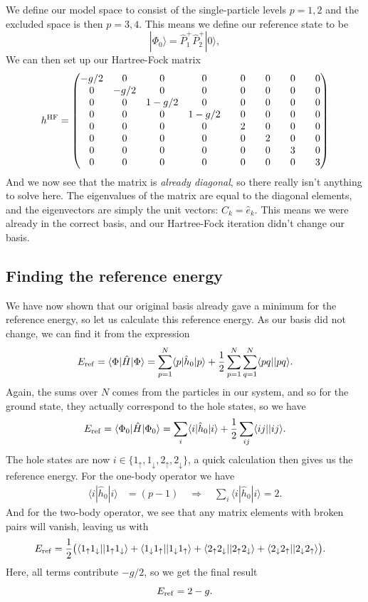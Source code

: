 \documentclass[a4paper, 11pt, notitlepage, english]{article}
\newcommand{\ket}[1]{|#1 \rangle}
\newcommand{\braket}[2]{\langle #1 | #2 \rangle}
\newcommand{\brakket}[2]{\langle #1 || #2 \rangle}
\newcommand{\op}[1]{\hat{#1}}
\newcommand{\braopket}[3]{\langle #1 | {#2} | #3 \rangle}
\renewcommand{\d}{{\rm d}}
\renewcommand{\u}{\uparrow}
\renewcommand{\d}{\downarrow}
\begin{document}
We define our model space to consist of the single-particle levels $p=1,2$ and the excluded space is then $p=3,4$. This means we define our reference state to be
$$\ket{\Phi_0} = \op{P}_1^+ \op{P}_2^+ \ket{0},$$
We can then set up our Hartree-Fock matrix
\begin{align*}
h^{\rm HF} = 
\begin{pmatrix}
-g/2 & 0 & 0 & 0 & \quad 0 & \quad 0 & \quad 0 & \quad 0 \\
0 & -g/2  & 0 & 0 & \quad 0 & \quad 0 & \quad 0 & \quad 0 \\
0 & 0 & 1-g/2 & 0 & \quad 0 & \quad 0 & \quad 0 & \quad 0 \\
0 & 0 & 0 & 1-g/2 & \quad 0 & \quad 0 & \quad 0 & \quad 0 \\
0 & 0 & 0 & 0 & \quad 2 & \quad 0 & \quad 0 & \quad 0 \\
0 & 0 & 0 & 0 & \quad 0 & \quad 2 & \quad 0 & \quad 0 \\
0 & 0 & 0 & 0 & \quad 0 & \quad 0 & \quad 3 & \quad 0 \\
0 & 0 & 0 & 0 & \quad 0 & \quad 0 & \quad 0 & \quad 3 \\
\end{pmatrix}
\end{align*}
And we now see that the matrix is \emph{already diagonal}, so there really isn't anything to solve here. The eigenvalues of the matrix are equal to the diagonal elements, and the eigenvectors are simply the unit vectors: $C_k = \hat{e}_k$. This means we were already in the correct basis, and our Hartree-Fock iteration didn't change our basis.

\subsection*{Finding the reference energy}
We have now shown that our original basis already gave a minimum for the reference energy, so let us calculate this reference energy. As our basis did not change, we can find it from the expression
$$E_{\rm ref} = \braopket{\Phi}{\op{H}}{\Phi} = \sum_{p=1}^N \braopket{p}{\op{h}_0}{p} + \frac{1}{2}\sum_{p=1}^N\sum_{q=1}^N\braket{pq|}{pq}.$$
Again, the sums over $N$ comes from the particles in our system, and so for the ground state, they actually correspond to the hole states, so we have
$$E_{\rm ref} = \braopket{\Phi_0}{\op{H}}{\Phi_0} = \sum_{i} \braopket{i}{\op{h}_0}{i} + \frac{1}{2}\sum_{ij} \brakket{ij}{ij}.$$
The hole states are now $i\in\{1_\u, 1_\d, 2_\u, 2_\d \}$, a quick calculation then gives us the reference energy. For the one-body operator we have
\begin{align*}
\braopket{i}{\op{h}_0}{i} &= (p-1) \quad \Rightarrow \quad \sum_{i} \braopket{i}{\op{h}_0}{i} = 2.
\end{align*}
And for the two-body operator, we see that any matrix elements with broken pairs will vanish, leaving us with
\begin{align*}
E_{\rm ref} &=   
\frac{1}{2}\big(
\brakket{1_\u1_\d}{1_\u1_\d} + \brakket{1_\d1_\u}{1_\d1_\u}
+ \brakket{2_\u2_\d}{2_\u2_\d} + \brakket{2_\d2_\u}{2_\d2_\u}
\big).
\end{align*}
Here, all terms contribute $-g/2$, so we get the final result
$$E_{\rm ref} = 2-g.$$
\end{document}
